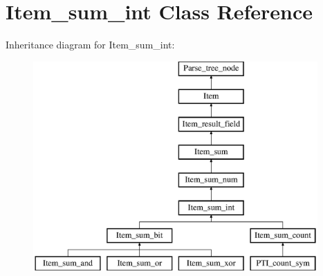 \hypertarget{classItem__sum__int}{}\section{Item\+\_\+sum\+\_\+int Class Reference}
\label{classItem__sum__int}
Inheritance diagram for Item\+\_\+sum\+\_\+int\+:\begin{figure}[H]
\begin{center}
\leavevmode
\includegraphics[height=8.000000cm]{classItem__sum__int}
\end{center}
\end{figure}
